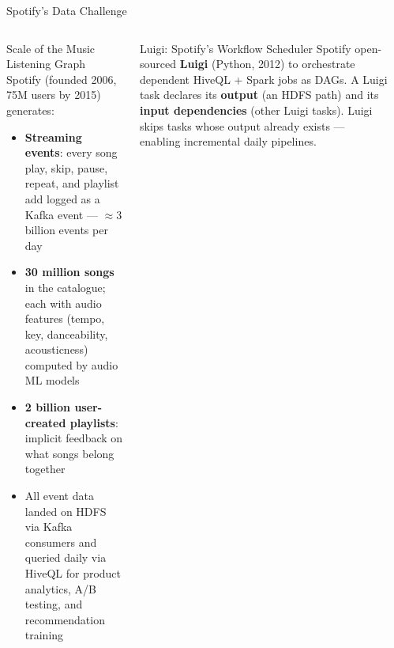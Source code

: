 \documentclass[aspectratio=169,10pt]{beamer}
\begin{document}
\begin{frame}{Spotify's Data Challenge}
  \begin{columns}[T]
      \begin{block}{Scale of the Music Listening Graph}
        Spotify (founded 2006, 75M users by 2015) generates:
        \begin{itemize}
          \item \textbf{Streaming events}: every song play, skip,
                pause, repeat, and playlist add logged as a Kafka event
                — $\approx$3 billion events per day
          \item \textbf{30 million songs} in the catalogue;
                each with audio features (tempo, key, danceability,
                acousticness) computed by audio ML models
          \item \textbf{2 billion user-created playlists}:
                implicit feedback on what songs belong together
          \item All event data landed on HDFS via Kafka consumers
                and queried daily via HiveQL for product analytics,
                A/B testing, and recommendation training
        \end{itemize}
      \end{block}
      \vspace{4pt}
      \begin{exampleblock}{Luigi: Spotify's Workflow Scheduler}
        Spotify open-sourced \textbf{Luigi} (Python, 2012) to
        orchestrate dependent HiveQL + Spark jobs as DAGs.
        A Luigi task declares its \textbf{output} (an HDFS path)
        and its \textbf{input dependencies} (other Luigi tasks).
        Luigi skips tasks whose output already exists —
        enabling incremental daily pipelines.
      \end{exampleblock}

      \begin{center}
\end{center}
\end{columns}
\end{frame}
\end{document}
